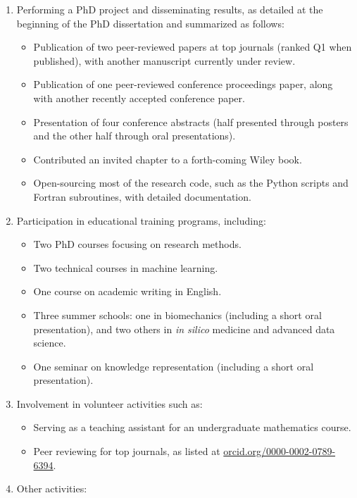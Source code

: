\begin{enumerate}[leftmargin=*]
    \item Performing a PhD project and disseminating results, as detailed at the beginning of the PhD dissertation and summarized as follows:
    \begin{itemize}
        \item Publication of two peer-reviewed papers at top journals (ranked Q1 when published), with another manuscript currently under review.
        \item Publication of one peer-reviewed conference proceedings paper, along with another recently accepted conference paper.
        \item Presentation of four conference abstracts (half presented through posters and the other half through oral presentations).
        \item Contributed an invited chapter to a forth-coming Wiley book.
        \item Open-sourcing most of the research code, such as the Python scripts and Fortran subroutines, with detailed documentation.
    \end{itemize}
    \item Participation in educational training programs, including:
    \begin{itemize}
        \item Two PhD courses focusing on research methods.
        \item Two technical courses in machine learning.
        \item One course on academic writing in English.
        \item Three summer schools: one in biomechanics (including a short oral presentation), and two others in \textit{in silico} medicine and advanced data science.
        \item One seminar on knowledge representation (including a short oral presentation).
    \end{itemize}
    \item Involvement in volunteer activities such as:
    \begin{itemize}
        \item Serving as a teaching assistant for an undergraduate mathematics course.
        \item Peer reviewing for top journals, as listed at \href{https://orcid.org/0000-0002-0789-6394}{orcid.org/0000-0002-0789-6394}.
    \end{itemize}
    \item Other activities:

\end{enumerate}
